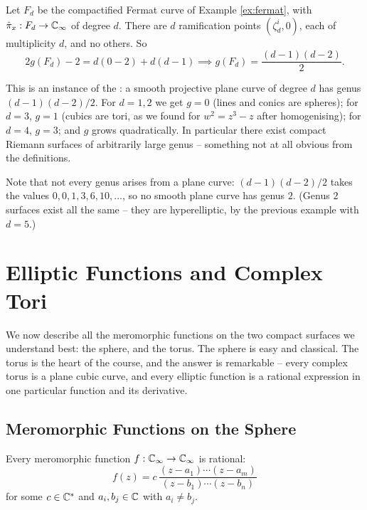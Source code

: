 \documentclass[a4paper]{scrartcl}
\newcommand{\Cinf}{\C_\infty}
\newcommand{\Cs}{\C^*}
\begin{document}
\begin{example}\label{ex:fermatgenus}
	Let $F_d$ be the compactified Fermat curve of Example \ref{ex:fermat}, with
	$\hat\pi_x : F_d \to \Cinf$ of degree $d$. There are $d$ ramification points
	$(\zeta_d^i, 0)$, each of multiplicity $d$, and no others. So
	$$
	2g(F_d) - 2 = d(0-2) + d(d-1) \implies g(F_d) = \frac{(d-1)(d-2)}{2}.
	$$

	This is an instance of the : a smooth projective plane
	curve of degree $d$ has genus $(d-1)(d-2)/2$. For $d = 1, 2$ we get $g = 0$ (lines and
	conics are spheres); for $d = 3$, $g = 1$ (cubics are tori, as we found for
	$w^2 = z^3-z$ after homogenising); for $d = 4$, $g = 3$; and $g$ grows quadratically.
	In particular there exist compact Riemann surfaces of arbitrarily large genus --
	something not at all obvious from the definitions.

	Note that not every genus arises from a plane curve: $(d-1)(d-2)/2$ takes the values
	$0,0,1,3,6,10,\dots$, so no smooth plane curve has genus $2$. (Genus $2$ surfaces exist
	all the same -- they are hyperelliptic, by the previous example with $d = 5$.)
\end{example}

\section{Elliptic Functions and Complex Tori}\label{sec:elliptic}

We now describe all the meromorphic functions on the two compact surfaces we understand
best: the sphere, and the torus. The sphere is easy and classical. The torus is the heart
of the course, and the answer is remarkable -- every complex torus is a plane cubic curve,
and every elliptic function is a rational expression in one particular function and its
derivative.

\subsection{Meromorphic Functions on the Sphere}

\begin{proposition}\label{prop:rational}
	Every meromorphic function $f : \Cinf \to \Cinf$ is rational:
	$$
	f(z) = c\,\frac{(z-a_1)\cdots(z-a_m)}{(z-b_1)\cdots(z-b_n)}
	$$
	for some $c \in \Cs$ and $a_i, b_j \in \mathbb{C}$ with $a_i \neq b_j$.
\end{proposition}
\end{document}

